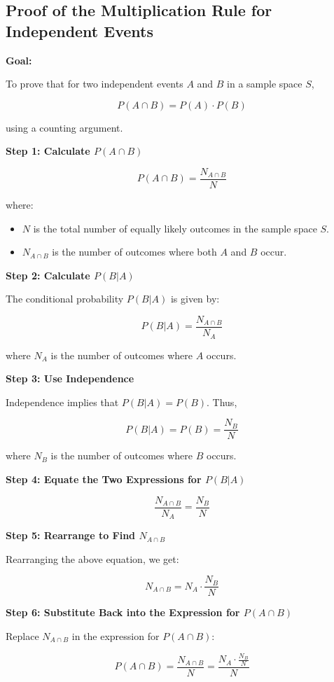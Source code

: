 \documentclass{article}
\begin{document}
\subsection*{Proof of the Multiplication Rule for Independent Events}

\textbf{Goal:}

To prove that for two independent events \( A \) and \( B \) in a sample space \( S \),

\[ P(A \cap B) = P(A) \cdot P(B) \]

using a counting argument.

\textbf{Step 1: Calculate \( P(A \cap B) \)}

\[
P(A \cap B) = \frac{N_{A \cap B}}{N}
\]

where:
\begin{itemize}
    \item \( N \) is the total number of equally likely outcomes in the sample space \( S \).
    \item \( N_{A \cap B} \) is the number of outcomes where both \( A \) and \( B \) occur.
\end{itemize}

\textbf{Step 2: Calculate \( P(B|A) \)}

The conditional probability \( P(B|A) \) is given by:

\[
P(B|A) = \frac{N_{A \cap B}}{N_A}
\]

where \( N_A \) is the number of outcomes where \( A \) occurs.

\textbf{Step 3: Use Independence}

Independence implies that \( P(B|A) = P(B) \). Thus,

\[
P(B|A) = P(B) = \frac{N_B}{N}
\]

where \( N_B \) is the number of outcomes where \( B \) occurs.

\textbf{Step 4: Equate the Two Expressions for \( P(B|A) \)}

\[
\frac{N_{A \cap B}}{N_A} = \frac{N_B}{N}
\]

\textbf{Step 5: Rearrange to Find \( N_{A \cap B} \)}

Rearranging the above equation, we get:

\[
N_{A \cap B} = N_A \cdot \frac{N_B}{N}
\]

\textbf{Step 6: Substitute Back into the Expression for \( P(A \cap B) \)}

Replace \( N_{A \cap B} \) in the expression for \( P(A \cap B) \):

\[
P(A \cap B) = \frac{N_{A \cap B}}{N} = \frac{N_A \cdot \frac{N_B}{N}}{N}
\]
\end{document}
